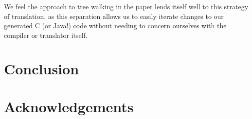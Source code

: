 \documentclass[times]{speauth}
\begin{document}
We feel the approach to tree walking in the paper lends itself well to this strategy of translation, as this separation allows us to easily iterate changes to our generated C (or Java!) code without needing to concern ourselves with the compiler or translator itself.


\section{Conclusion}


\section{Acknowledgements}


\end{document}
